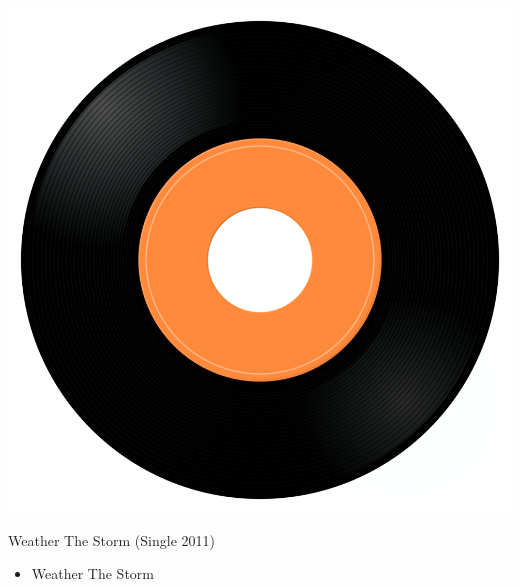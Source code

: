 \begin{minipage}[t]{0.25\textwidth}\vspace{0pt}
\captionsetup{type=figure}
\includegraphics[width=\textwidth]{Images/cover.png}
\caption*{Weather The Storm (Single 2011)}
\end{minipage}
\begin{minipage}[t]{0.25\textwidth}\vspace{0pt}
\begin{itemize}[nosep,leftmargin=1em,labelwidth=*,align=left]
	\setlength{\itemsep}{0pt}
	\item Weather The Storm
\end{itemize}
\end{minipage}
